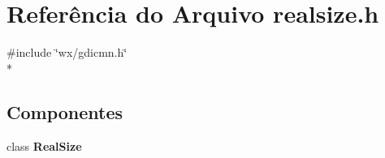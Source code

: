 \section{Referência do Arquivo realsize.\+h}
\label{realsize_8h}
{\ttfamily \#include \char`\"{}wx/gdicmn.\+h\char`\"{}}\\*
\subsection*{Componentes}
\begin{DoxyCompactItemize}
\item 
class {\bf Real\+Size}
\end{DoxyCompactItemize}
